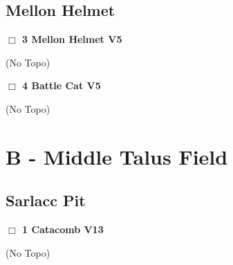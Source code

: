 \begin{multicols}{2}
\needspace{10em}
\subsection*{Mellon Helmet}\label{bf:Mellon Helmet}




\needspace{2em}
\label{rt:Mellon Helmet}
\colorbox{RoyalBlue!20}{
\parbox{0.95\linewidth}{
\hspace{-1ex}\textbf{$\Box$
3 Mellon Helmet V5  
}}}
\begin{adjustwidth}{1.3em}{}			


  (No Topo)
\end{adjustwidth}




\needspace{2em}
\label{rt:Battle Cat}
\colorbox{RoyalBlue!20}{
\parbox{0.95\linewidth}{
\hspace{-1ex}\textbf{$\Box$
4 Battle Cat V5  
}}}
\begin{adjustwidth}{1.3em}{}			


  (No Topo)
\end{adjustwidth}





\newpage

\section{B - Middle Talus Field}\label{sa:Middle Talus Field}





\needspace{10em}
\subsection*{Sarlacc Pit}\label{bf:Sarlacc Pit}




\needspace{2em}
\label{rt:Catacomb}
\colorbox{red!20}{
\parbox{0.95\linewidth}{
\hspace{-1ex}\textbf{$\Box$
1 Catacomb V13  
}}}
\begin{adjustwidth}{1.3em}{}			


  (No Topo)
\end{adjustwidth}






\end{multicols}
\clearpage